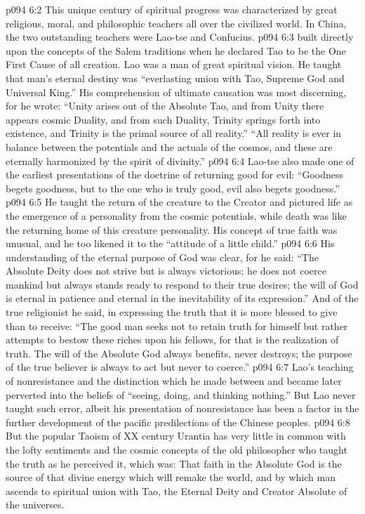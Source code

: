 \vs p094 6:2 This unique century of spiritual progress was characterized by great religious, moral, and philosophic teachers all over the civilized world. In China, the two outstanding teachers were Lao\hyp{}tse and Confucius.
\vs p094 6:3 \pc {} built directly upon the concepts of the Salem traditions when he declared Tao to be the One First Cause of all creation. Lao was a man of great spiritual vision. He taught that man’s eternal destiny was “everlasting union with Tao, Supreme God and Universal King.” His comprehension of ultimate causation was most discerning, for he wrote: “Unity arises out of the Absolute Tao, and from Unity there appears cosmic Duality, and from such Duality, Trinity springs forth into existence, and Trinity is the primal source of all reality.” “All reality is ever in balance between the potentials and the actuals of the cosmos, and these are eternally harmonized by the spirit of divinity.”
\vs p094 6:4 Lao\hyp{}tse also made one of the earliest presentations of the doctrine of returning good for evil: “Goodness begets goodness, but to the one who is truly good, evil also begets goodness.”
\vs p094 6:5 He taught the return of the creature to the Creator and pictured life as the emergence of a personality from the cosmic potentials, while death was like the returning home of this creature personality. His concept of true faith was unusual, and he too likened it to the “attitude of a little child.”
\vs p094 6:6 His understanding of the eternal purpose of God was clear, for he said: “The Absolute Deity does not strive but is always victorious; he does not coerce mankind but always stands ready to respond to their true desires; the will of God is eternal in patience and eternal in the inevitability of its expression.” And of the true religionist he said, in expressing the truth that it is more blessed to give than to receive: “The good man seeks not to retain truth for himself but rather attempts to bestow these riches upon his fellows, for that is the realization of truth. The will of the Absolute God always benefits, never destroys; the purpose of the true believer is always to act but never to coerce.”
\vs p094 6:7 Lao’s teaching of nonresistance and the distinction which he made between  and  became later perverted into the beliefs of “seeing, doing, and thinking nothing.” But Lao never taught such error, albeit his presentation of nonresistance has been a factor in the further development of the pacific predilections of the Chinese peoples.
\vs p094 6:8 But the popular Taoism of XX century Urantia has very little in common with the lofty sentiments and the cosmic concepts of the old philosopher who taught the truth as he perceived it, which was: That faith in the Absolute God is the source of that divine energy which will remake the world, and by which man ascends to spiritual union with Tao, the Eternal Deity and Creator Absolute of the universes.
